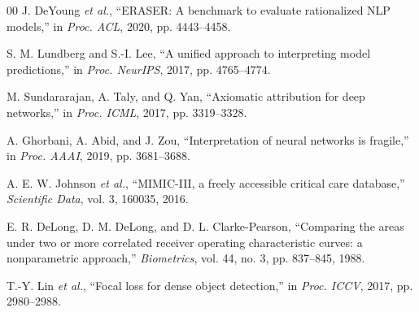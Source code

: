 \documentclass[conference]{IEEEtran}
\begin{document}
\begin{thebibliography}{00}
 J. DeYoung \emph{et al.}, ``ERASER: A benchmark to evaluate rationalized NLP models,'' in \emph{Proc. ACL}, 2020, pp. 4443--4458.

 S. M. Lundberg and S.-I. Lee, ``A unified approach to interpreting model predictions,'' in \emph{Proc. NeurIPS}, 2017, pp. 4765--4774.

 M. Sundararajan, A. Taly, and Q. Yan, ``Axiomatic attribution for deep networks,'' in \emph{Proc. ICML}, 2017, pp. 3319--3328.

 A. Ghorbani, A. Abid, and J. Zou, ``Interpretation of neural networks is fragile,'' in \emph{Proc. AAAI}, 2019, pp. 3681--3688.

 A. E. W. Johnson \emph{et al.}, ``MIMIC-III, a freely accessible critical care database,'' \emph{Scientific Data}, vol. 3, 160035, 2016.

 E. R. DeLong, D. M. DeLong, and D. L. Clarke-Pearson, ``Comparing the areas under two or more correlated receiver operating characteristic curves: a nonparametric approach,'' \emph{Biometrics}, vol. 44, no. 3, pp. 837--845, 1988.

 T.-Y. Lin \emph{et al.}, ``Focal loss for dense object detection,'' in \emph{Proc. ICCV}, 2017, pp. 2980--2988.

\end{thebibliography}
\end{document}
